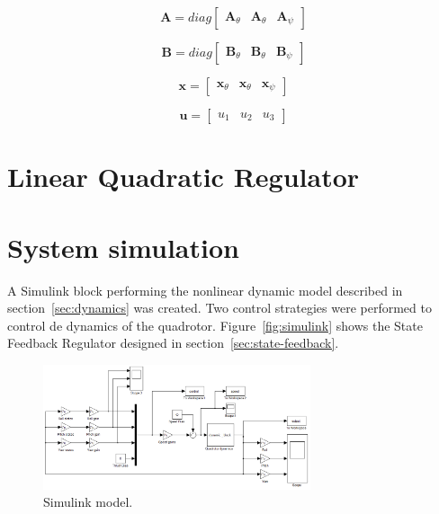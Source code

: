 \documentclass[12pt]{article}
\begin{document}
\begin{equation}
\mathbf{A} = diag\begin{bmatrix} \mathbf{A}_\theta & \mathbf{A}_\theta & \mathbf{A}_\psi \end{bmatrix}
\end{equation}

\begin{equation}
\mathbf{B} = diag\begin{bmatrix} \mathbf{B}_\theta & \mathbf{B}_\theta & \mathbf{B}_\psi \end{bmatrix}
\end{equation}

\begin{equation}
\mathbf{x} = \begin{bmatrix} \mathbf{x}_\theta & \mathbf{x}_\theta & \mathbf{x}_\psi \end{bmatrix}
\end{equation}

\begin{equation}
\mathbf{u} = \begin{bmatrix} u_1 & u_2 & u_3 \end{bmatrix}
\end{equation}

\section{Linear Quadratic Regulator}

\section{System simulation}
A Simulink block performing the nonlinear dynamic model described in section~\ref{sec:dynamics} was created. Two control strategies were performed to control de dynamics of the quadrotor. Figure~\ref{fig:simulink} shows the State Feedback Regulator designed in section~\ref{sec:state-feedback}.

\begin{figure}
  \centering
  \includegraphics[width=0.7\textwidth]{Simulink.png}
  \caption{Simulink model.}
  \label{fig:model}
\end{figure}
\end{document}
